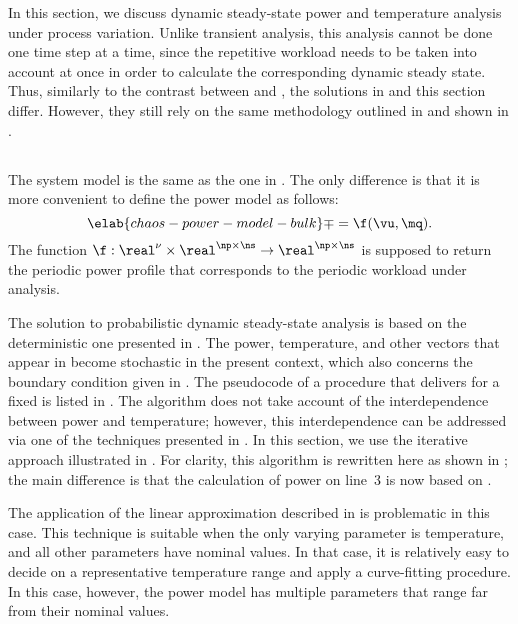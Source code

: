 In this section, we discuss dynamic steady-state power and temperature analysis
under process variation. Unlike transient analysis, this analysis cannot be done
one time step at a time, since the repetitive workload needs to be taken into
account at once in order to calculate the corresponding dynamic steady state.
Thus, similarly to the contrast between  and
, the solutions in 
and this section differ. However, they still rely on the same methodology
outlined in  and shown in
.

\subsection{\problemtitle}

The system model is the same as the one in . The
only difference is that it is more convenient to define the power model as
follows:
\begin{equation} \elab{chaos-power-model-bulk}
  \mp = \f(\vu, \mq).
\end{equation}
The function $\f: \real^\nu \times \real^{\np \times \ns} \to \real^{\np \times
\ns}$ is supposed to return the periodic power profile that corresponds to the
periodic workload under analysis.

The solution to probabilistic dynamic steady-state analysis is based on the
deterministic one presented in . The power,
temperature, and other vectors that appear in 
become stochastic in the present context, which also concerns the boundary
condition given in . The pseudocode of a
procedure that delivers \mq for a fixed \vu is listed in
. The algorithm does not take account of the
interdependence between power and temperature; however, this interdependence can
be addressed via one of the techniques presented in . In
this section, we use the iterative approach illustrated in
. For clarity, this algorithm is
rewritten here as shown in ; the
main difference is that the calculation of power on line~3 is now based on
.

\begin{remark}
The application of the linear approximation described in
 is problematic in this case. This technique is suitable
when the only varying parameter is temperature, and all other parameters have
nominal values. In that case, it is relatively easy to decide on a
representative temperature range and apply a curve-fitting procedure. In this
case, however, the power model has multiple parameters that range far from their
nominal values.
\end{remark}


